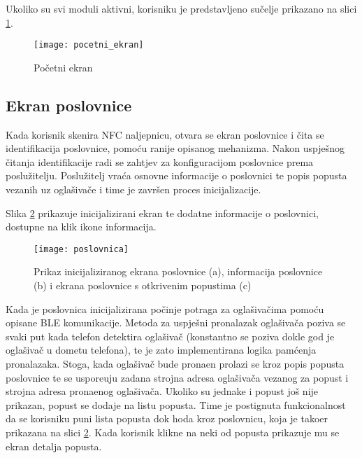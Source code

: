 Ukoliko su svi moduli aktivni, korisniku je predstavljeno su\v{c}elje prikazano na slici \ref{fig:pocetniEkran}.


\begin{figure}[!htbp]
	\begin{center}
 \texttt{[image: pocetni\_ekran]}
 \caption{Po\v{c}etni ekran}
 \label{fig:pocetniEkran}
	\end{center}
\end{figure}


\subsection{Ekran poslovnice}

Kada korisnik skenira NFC naljepnicu, otvara se ekran poslovnice i \v{c}ita se identifikacija poslovnice, pomo\'{c}u ranije opisanog mehanizma. Nakon uspje\v{s}nog \v{c}itanja identifikacije radi se zahtjev za konfiguracijom poslovnice prema poslu\v{z}itelju. Poslu\v{z}itelj vra\'{c}a osnovne informacije o poslovnici te popis popusta vezanih uz ogla\v{s}iva\v{c}e i time je zavr\v{s}en proces inicijalizacije.

Slika \ref{fig:poslovnica} prikazuje inicijalizirani ekran te dodatne informacije o poslovnici, dostupne na klik ikone informacija.



\begin{figure}[!htbp]
	\begin{center}
 \texttt{[image: poslovnica]}
 \caption{Prikaz inicijaliziranog ekrana poslovnice (a), informacija poslovnice (b) i ekrana poslovnice s otkrivenim popustima (c)}
 \label{fig:poslovnica}
	\end{center}
\end{figure}

Kada je poslovnica inicijalizirana po\v{c}inje potraga za ogla\v{s}iva\v{c}ima pomo\'{c}u opisane BLE komunikacije. Metoda za uspje\v{s}ni pronalazak ogla\v{s}iva\v{c}a poziva se svaki put kada telefon detektira ogla\v{s}iva\v{c} (konstantno se poziva dokle god je ogla\v{s}iva\v{c} u dometu telefona), te je zato implementirana logika pam\'{c}enja pronalazaka. Stoga, kada ogla\v{s}iva\v{c} bude prona\dj en prolazi se kroz popis popusta poslovnice te se uspore\dj uju zadana strojna adresa ogla\v{s}iva\v{c}a vezanog za popust i strojna adresa prona\dj enog ogla\v{s}iva\v{c}a. Ukoliko su jednake i popust jo\v{s} nije prikazan, popust se dodaje na listu popusta. Time je postignuta funkcionalnost da se korisniku puni lista popusta dok hoda kroz poslovnicu, koja je tako\dj er prikazana na slici \ref{fig:poslovnica}. Kada korisnik klikne na neki od popusta prikazuje mu se ekran detalja popusta.


